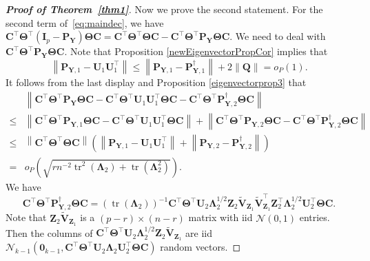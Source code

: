 \documentclass[10pt]{book}
\theoremstyle{definition}
\DeclareMathOperator{\mytr}{tr}
\newcommand{\bQ}{\mathbf{Q}}
\newcommand{\bZ}{\mathbf{Z}}
\newcommand{\bP}{\mathbf{P}}
\newcommand{\bY}{\mathbf{Y}}
\newcommand{\bC}{\mathbf{C}}
\newcommand{\bI}{\mathbf{I}}
\newcommand{\bU}{\mathbf{U}}
\newcommand{\bV}{\mathbf{V}}
\newcommand{\bfsym}[1]{\ensuremath{\boldsymbol{#1}}}
\def\bLambda {\bfsym {\Lambda}}
\def\bTheta {\bfsym {\Theta}}
\begin{document}
\begin{proof}[\textbf{Proof of Theorem~\ref{thm1}}]
Now we prove the second statement.
For the second term of~\eqref{eq:maindec}, we have
$
    \bC^\top \bTheta^\top (\bI_p-\bP_\bY)\bTheta \bC=
    \bC^\top \bTheta^\top\bTheta \bC -
    \bC^\top \bTheta^\top \bP_{\bY} \bTheta \bC
    $.
    We need to deal with
    $
    \bC^\top \bTheta^\top \bP_{\bY} \bTheta \bC
    $.
    Note that Proposition \ref{newEigenvectorPropCor} implies that
    \begin{equation*}
\left\| \bP_{\bY,1}-\bU_1\bU_1^\top\right\|
\leq
\left\| \bP_{\bY,1}-\bP_{\bY,1}^\dagger\right\|+2\left\|\bQ\right\|=o_P(1)
.
    \end{equation*}
    It follows from the last display and Proposition \ref{eigenvectorprop3} that
    \begin{equation*}
        \begin{split}
        &\left\|
        \bC^\top \bTheta^\top \bP_{\bY} \bTheta \bC
        -
        \bC^\top \bTheta^\top \bU_1 \bU_1^\top \bTheta \bC
        -
        \bC^\top \bTheta^\top \bP_{\bY,2}^\dagger \bTheta \bC
        \right\|
        \\
        \leq
        &
        \left\|
        \bC^\top \bTheta^\top \bP_{\bY,1} \bTheta \bC
        -
        \bC^\top \bTheta^\top \bU_1 \bU_1^\top  \bTheta \bC
        \right\|
        +
        \left\|
        \bC^\top \bTheta^\top \bP_{\bY,2} \bTheta \bC
        -
        \bC^\top \bTheta^\top \bP_{\bY,2}^\dagger \bTheta \bC
        \right\|
        \\
        \leq &
\left\|
        \bC^\top \bTheta^\top \bTheta \bC
\right\|
\left(
\left\| \bP_{\bY,1}-\bU_1\bU_1^\top\right\|
    +
    \left\| \bP_{\bY,2}-\bP_{\bY,2}^\dagger\right\|
\right)
\\
=&
o_P\left(
\sqrt{
        rn^{-2} \mytr^2 (\bLambda_2) + \mytr(\bLambda_2^2)
}
\right).
        \end{split}
    \end{equation*}
    We have
\begin{equation*}
        \bC^\top \bTheta^\top \bP_{\bY,2}^\dagger \bTheta \bC
        =
        \left(\mytr(\bLambda_2)\right)^{-1}
        \bC^\top \bTheta^\top \bU_2 \bLambda_2^{1/2} \bZ_{2} \tilde{\bV}_{\bZ_1}  \tilde{\bV}_{\bZ_1}^\top \bZ_2^\top \bLambda_2^{1/2} \bU_2^\top   \bTheta \bC.
\end{equation*}
Note that $\bZ_{2} \tilde{\bV}_{\bZ_1}$ is a $(p-r) \times (n-r) $ matrix with iid $\mathcal{N}(0,1)$ entries.
Then the columns of $\bC^\top \bTheta^\top \bU_2 \bLambda_2^{1/2} \bZ_{2} \tilde{\bV}_{\bZ_1}$ are iid $\mathcal{N}_{k-1}(\mathbf{0}_{k-1},\bC^\top \bTheta^\top \bU_2 \bLambda_2 \bU_2^\top \bTheta \bC)$ random vectors.

\end{proof}
\end{document}

